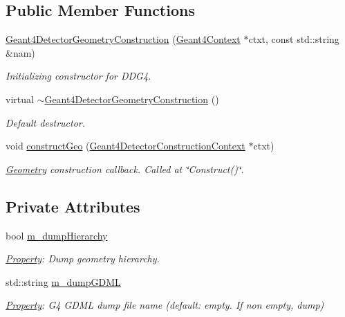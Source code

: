 \subsection*{Public Member Functions}
\begin{DoxyCompactItemize}
\item 
\hyperlink{class_d_d4hep_1_1_simulation_1_1_geant4_detector_geometry_construction_a877334f0a23cdc4e7a80a34c15974f4d}{Geant4\+Detector\+Geometry\+Construction} (\hyperlink{class_d_d4hep_1_1_simulation_1_1_geant4_context}{Geant4\+Context} $\ast$ctxt, const std\+::string \&nam)
\begin{DoxyCompactList}\small\item\em Initializing constructor for D\+D\+G4. \end{DoxyCompactList}\item 
virtual \hyperlink{class_d_d4hep_1_1_simulation_1_1_geant4_detector_geometry_construction_ad0f9d21253bd2cf44ce3ce56b52838b7}{$\sim$\+Geant4\+Detector\+Geometry\+Construction} ()
\begin{DoxyCompactList}\small\item\em Default destructor. \end{DoxyCompactList}\item 
void \hyperlink{class_d_d4hep_1_1_simulation_1_1_geant4_detector_geometry_construction_ab20b86bfe9009f93ce567ef418e266af}{construct\+Geo} (\hyperlink{class_d_d4hep_1_1_simulation_1_1_geant4_detector_construction_context}{Geant4\+Detector\+Construction\+Context} $\ast$ctxt)
\begin{DoxyCompactList}\small\item\em \hyperlink{namespace_d_d4hep_1_1_geometry}{Geometry} construction callback. Called at \char`\"{}\+Construct()\char`\"{}. \end{DoxyCompactList}\end{DoxyCompactItemize}
\subsection*{Private Attributes}
\begin{DoxyCompactItemize}
\item 
bool \hyperlink{class_d_d4hep_1_1_simulation_1_1_geant4_detector_geometry_construction_ac003c6513973e596d5d214206c3f8d99}{m\+\_\+dump\+Hierarchy}
\begin{DoxyCompactList}\small\item\em \hyperlink{class_d_d4hep_1_1_property}{Property}\+: Dump geometry hierarchy. \end{DoxyCompactList}\item 
std\+::string \hyperlink{class_d_d4hep_1_1_simulation_1_1_geant4_detector_geometry_construction_abb2b35066d2a33cd98aaf1d960ce60cc}{m\+\_\+dump\+G\+D\+ML}
\begin{DoxyCompactList}\small\item\em \hyperlink{class_d_d4hep_1_1_property}{Property}\+: G4 G\+D\+ML dump file name (default\+: empty. If non empty, dump) \end{DoxyCompactList}\end{DoxyCompactItemize}
